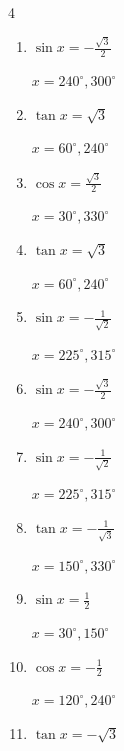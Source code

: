\begin{multicols}{4}
\begin{enumerate}
        $\displaystyle x = 30^{\circ} , 330^{\circ}$

  \item $\displaystyle \sin{x}  = -\frac{\sqrt{3}}{2}$

        $\displaystyle x = 240^{\circ} , 300^{\circ}$

  \item $\displaystyle \tan{x}  = \sqrt{3}$

        $\displaystyle x = 60^{\circ} , 240^{\circ}$

  \item $\displaystyle \cos{x}  = \frac{\sqrt{3}}{2}$

        $\displaystyle x = 30^{\circ} , 330^{\circ}$

  \item $\displaystyle \tan{x}  = \sqrt{3}$

        $\displaystyle x = 60^{\circ} , 240^{\circ}$

\columnbreak %

\resetques

  \item $\displaystyle \sin{x}  = -\frac{1}{\sqrt{2}}$

        $\displaystyle x = 225^{\circ} , 315^{\circ}$

  \item $\displaystyle \sin{x}  = -\frac{\sqrt{3}}{2}$

        $\displaystyle x = 240^{\circ} , 300^{\circ}$

  \item $\displaystyle \sin{x}  = -\frac{1}{\sqrt{2}}$

        $\displaystyle x = 225^{\circ} , 315^{\circ}$

  \item $\displaystyle \tan{x}  = -\frac{1}{\sqrt{3}}$

        $\displaystyle x = 150^{\circ} , 330^{\circ}$

  \item $\displaystyle \sin{x}  = \frac{1}{2}$

        $\displaystyle x = 30^{\circ} , 150^{\circ}$

  \item $\displaystyle \cos{x}  = -\frac{1}{2}$

        $\displaystyle x = 120^{\circ} , 240^{\circ}$

  \item $\displaystyle \tan{x}  = -\sqrt{3}$


\end{enumerate}
\end{multicols}
